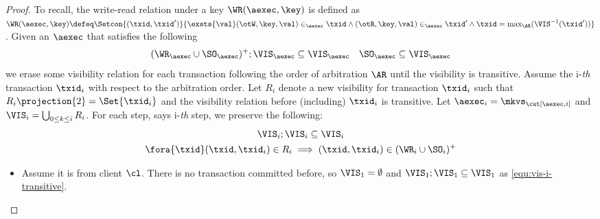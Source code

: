 \begin{proof}
    To recall, the write-read relation under a key \( \WR(\aexec, \key) \) is defined as 
    \( \WR(\aexec, \key) \defeq \Setcon{ (\txid, \txid') }{ \exsts{\val} (\otW, \key, \val) \in_\aexec \txid \land (\otR, \key, \val) \in_\aexec \txid' \land \txid = \max_\AR(\VIS^{-1}(\txid')) }\).
    Given an \( \aexec \) that satisfies the following
    \[
        (\WR_\aexec \cup \SO_\aexec )^{+} ; \VIS_\aexec \subseteq \VIS_\aexec \quad \SO_\aexec \subseteq \VIS_\aexec
    \]
    we erase some visibility relation for each transaction following the order of arbitration \( \AR \) until the visibility is transitive.
    Assume the i-\emph{th} transaction \( \txid_i \)  with respect to the arbitration order.
    Let \( R_i \) denote a new visibility for transaction \( \txid_i \) such that
    \( R_i\projection{2} = \Set{\txid_i}\)
    and the visibility relation before (including) \( \txid_i \) is transitive.
    Let \( \aexec_i = \mkvs_{\cut[\aexec, i]} \) and \( \VIS_i = \bigcup_{0 \leq k \leq i} R_i \).
    For each step, says i-\emph{th} step, we  preserve the following:
    \begin{gather}
        \VIS_i ; \VIS_i \subseteq \VIS_i \label{equ:vis-i-transitive} \\
        \fora{\txid} (\txid,\txid_i) \in R_i \implies (\txid, \txid_i) \in (\WR_i \cup \SO_i)^{+}
        \label{equ:last-read-correct}
    \end{gather}
    
    \begin{itemize}
    \item {}
    Assume it is from client \( \cl \).
    There is no transaction committed before, so \( \VIS_1 = \emptyset \) and \( \VIS_1 ; \VIS_1 \subseteq \VIS_1 \) as \cref{equ:vis-i-transitive}.


\end{itemize}
\end{proof}
